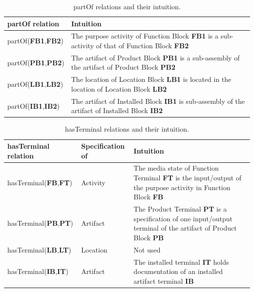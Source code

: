 \begin{table}[htb]\centering\caption{partOf relations and their intuition.}\label{tab:Table 10}
  \begin{supertabular}{|m{1.1975598in}|m{4.94136in}|}
    \hline
    {\bfseries partOf relation} &
    {\bfseries Intuition}\\\hline
    partOf(\textbf{FB1},\textbf{FB2}) &
    The purpose activity of Function Block \textbf{FB1} is a sub-activity of that of Function Block \textbf{FB2}\\\hline
    partOf(\textbf{PB1},\textbf{PB2}) &
    The artifact of Product Block \textbf{PB1} is a sub-assembly of the artifact of Product Block \textbf{PB2}\\\hline
    partOf(\textbf{LB1},\textbf{LB2}) &
    The location of Location Block \textbf{LB1} is located in the location of Location Block \textbf{LB2}\\\hline
    partOf(\textbf{IB1},\textbf{IB2}) &
    The artifact of Installed Block \textbf{IB1} is sub-assembly of the artifact of Installed Block \textbf{IB2}\\\hline
  \end{supertabular}
\end{table}

\begin{table}[htb]\centering\caption{hasTerminal relations and their intuition.}\label{tab:Table 11}
  \begin{supertabular}{|m{1.1975598in}|m{0.90595984in}|m{4.00386in}|}
    \hline
    \textbf{hasTerminal relation} &
    {\bfseries Specification of} &
    {\bfseries Intuition}\\\hline
    hasTerminal(\textbf{FB},\textbf{FT}) &
    Activity &
    The media state of Function Terminal \textbf{FT} is the input/output of the purpose activity in Function Block\textbf{
      FB}\\\hline
    hasTerminal(\textbf{PB},\textbf{PT}) &
    Artifact &
    The Product Terminal \textbf{PT} is a specification of one input/output terminal of the artifact of Product Block
    \textbf{PB}\\\hline
    hasTerminal(\textbf{LB},\textbf{LT}) &
    Location &
    Not used\\\hline
    hasTerminal(\textbf{IB},\textbf{IT}) &
    Artifact &
    The installed terminal \textbf{IT} holds documentation of an installed artifact terminal \textbf{IB}\\\hline
  \end{supertabular}
\end{table}


